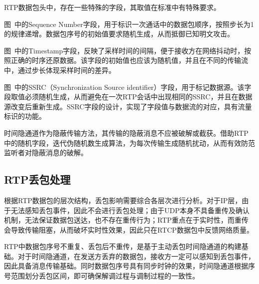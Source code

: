 RTP数据包头中，存在一些特殊的字段，其取值在标准中有特殊要求。

图\ 中的{Sequence Number}字段，用于标识一次通话中的数据包顺序，按照步长为1的规律递增。数据包序号的初始值要求随机生成，从而抵御已知明文攻击。

图\ 中的{Timestamp}字段，反映了采样时间的间隔，便于接收方在网络抖动时，按照正确的时序还原数据。该字段的初始值也应该为随机值，并且在不同的传输流中，通过步长体现采样时间的差异。

图\ 中的{SSRC}（{Synchronization Source identifier}）字段，用于标记数据源。该字段取值必须随机生成，从而避免在一次RTP会话中出现相同的{SSRC}，并且在数据源改变后重新生成。{SSRC}字段的设计，实现了字段值与数据流的对应，具有流量标识的功能。

时间隐通道作为隐蔽传输方法，其传输的隐蔽消息不应被破解或截获。借助RTP中的随机字段，迭代伪随机数生成算法，为每次传输生成随机扰动，从而有效防范监听者对隐蔽消息的破解。

\subsection{RTP丢包处理}
\label{chap:backinfo:rtp:dropout}

根据RTP数据包的层次结构，丢包影响需要综合各层次进行分析。对于IP层，由于无法感知丢包事件，因此不会进行丢包处理；由于UDP本身不具备重传及确认机制，无法保证数据包送达，也不存在重传行为；RTP重点在于实时性，而重传会导致传输阻塞，从而破坏实时性效果，因此只在RTCP数据包中反馈网络质量。

RTP中数据包序号不重复、丢包后不重传，是基于主动丢包时间隐通道的构建基础。对于时间隐通道，在发送方丢弃的数据包，接收方一定可以感知到丢包事件，因此具备消息传输基础。同时数据包序号具有同步时钟的效果，时间隐通道根据序号范围划分丢包区间，即可确保解调过程与调制过程的一致性。